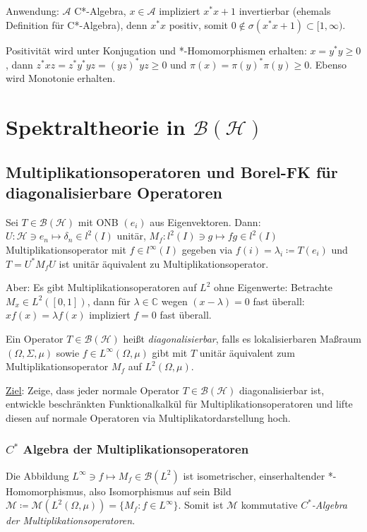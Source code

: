 \documentclass[11pt,a4paper]{scrartcl}
\newcommand{\C}{\mathbb{C}} %
\newcommand{\Hc}{\mathcal{H}}
\newcommand{\A}{\mathcal{A}}
\newcommand{\B}{\mathcal{B}}
\newcommand{\M}{\mathcal{M}}
\theoremstyle{plain}
\theoremstyle{definition}
\theoremstyle{remark}
\begin{document}
Anwendung: $\A$ C*-Algebra, $x\in \A$ impliziert $x^*x+1$ invertierbar (ehemals Definition für C*-Algebra), denn $x^*x$ positiv, somit $0\not\in \sigma(x^*x+1) \subset [1,\infty)$.

Positivität wird unter Konjugation und *-Homomorphismen erhalten: $x=y^*y\geq 0$, dann $z^*xz=z^*y^*yz=(yz)^*yz \geq0$ und $\pi(x)=\pi(y)^*\pi(y) \geq 0$. Ebenso wird Monotonie erhalten.

\section{Spektraltheorie in $\B(\Hc)$}

\subsection{Multiplikationsoperatoren und Borel-FK für diagonalisierbare Operatoren}

Sei $T\in \B(\Hc)$ mit ONB $(e_i)$ aus Eigenvektoren. Dann: $U: \Hc \ni e_n \mapsto \delta_n \in l^2(I)$ unitär, $M_f: l^2(I) \ni g \mapsto fg \in l^2(I)$ Multiplikationsoperator mit $f\in l^\infty(I)$ gegeben via $f(i)=\lambda_i\coloneqq T(e_i)$ und $T=U^*M_f U$ ist unitär äquivalent zu Multiplikationsoperator.

Aber: Es gibt Multiplikationsoperatoren auf $L^2$ ohne Eigenwerte: Betrachte $M_x \in L^2([0,1])$, dann für $\lambda\in\C$ wegen $(x-\lambda)=0$ fast überall: $x f(x) = \lambda f(x)$ impliziert $f=0$ fast überall.

Ein Operator $T\in \B(\Hc)$ heißt \emph{diagonalisierbar}, falls es lokalisierbaren Maßraum $(\Omega, \Sigma, \mu)$ sowie $f\in L^\infty(\Omega, \mu)$ gibt mit $T$ unitär äquivalent zum Multiplikationsoperator $M_f$ auf $L^2(\Omega, \mu)$.

\underline{Ziel}: Zeige, dass jeder normale Operator $T\in \B(\Hc)$ diagonalisierbar ist, entwickle beschränkten Funktionalkalkül für Multiplikationsoperatoren und lifte diesen auf normale Operatoren via Multiplikatordarstellung hoch.

\subsubsection{$C^*$ Algebra der Multiplikationsoperatoren}

Die Abbildung $L^\infty \ni f \mapsto M_f \in \B(L^2)$ ist isometrischer, einserhaltender *-Homomorphismus, also Isomorphismus auf sein Bild $\M\coloneqq \M(L^2(\Omega,\mu))=\{ M_f: f\in L^\infty \}$. Somit ist $\M$ kommutative \emph{$C^*$-Algebra der Multiplikationsoperatoren}.
\end{document}
